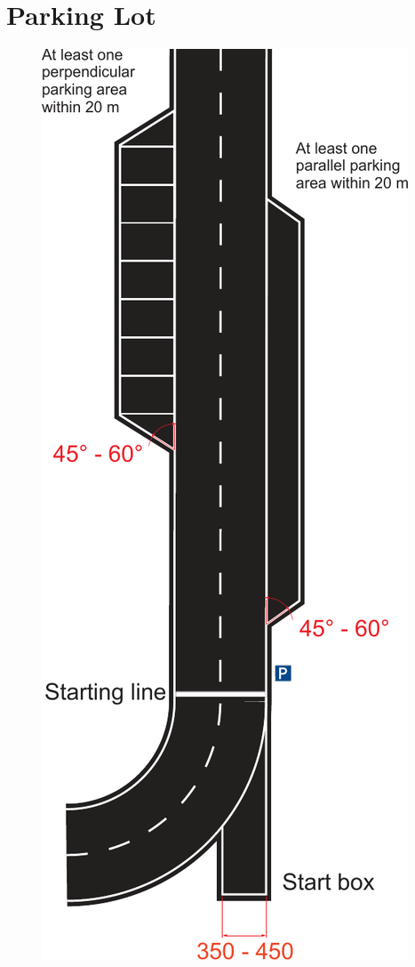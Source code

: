 \section{Parking Lot}
\label{fig_parking_lot}
\begin{figure}[H]
	\begin{center}
		\centering\includegraphics[height=0.9\textheight]{graphics/Abb_1_parking_lot.pdf}
	\end{center}
\end{figure}

